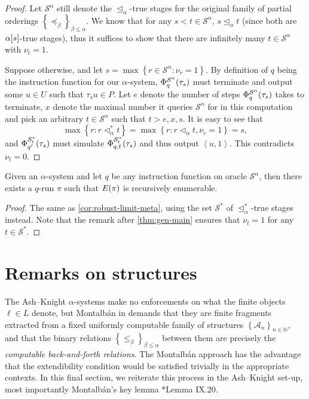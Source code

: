 \documentclass[11pt]{article}
\theoremstyle{plain}
\theoremstyle{definition}
\newcommand{\tuple}[1]{\left\langle #1 \right\rangle}
\begin{document}
\begin{proof}
  Let $\mathcal{S}^\alpha$ still denote the $\unlhd_\alpha$-true stages for the original family of partial orderings $\left\{\preceq_\beta\right\}_{\beta \leq \alpha}$. We know that for any $s < t \in \mathcal{S}^\alpha$, $s \unlhd_\alpha t$ (since both are $\alpha\mleft[s\mright]$-true stages), thus it suffices to show that there are infinitely many $t \in \mathcal{S}^\alpha$ with $\nu_t = 1$.

  Suppose otherwise, and let $s = \max \left\{r \in \mathcal{S}^\alpha : \nu_r = 1\right\}$. By definition of $q$ being the instruction function for our $\alpha$-system, $\Phi_q^{\mathcal{S}^\alpha}\mleft(\tau_s\mright)$ must terminate and output some $u \in U$ such that $\tau_s u \in P$. Let $e$ denote the number of steps $\Phi_q^{\mathcal{S}^\alpha}\mleft(\tau_s\mright)$ takes to terminate, $x$ denote the maximal number it queries $\mathcal{S}^\alpha$ for in this computation and pick an arbitrary $t \in \mathcal{S}^\alpha$ such that $t > e, x, s$. It is easy to see that
  \[\max \left\{r : r \lhd_\alpha^* t\right\} = \max \left\{r : r \lhd_\alpha t, \nu_r = 1\right\} = s,\]
  and $\Phi_{q'}^{\mathcal{S}^*_t}\mleft(\tau_s\mright)$ must simulate $\Phi_{q, t}^{\mathcal{S}^\alpha_t}\mleft(\tau_s\mright)$ and thus output $\tuple{u, 1}$. This contradicts $\nu_t = 0$.
\end{proof}

\begin{corollary}
  Given an $\alpha$-system and let $q$ be any instruction function on oracle $\mathcal{S}^\alpha$, then there exists a $q$-run $\pi$ such that $E\mleft(\pi\mright)$ is recursively enumerable.
\end{corollary}

\begin{proof}
  The same as \autoref{cor:robust-limit-meta}, using the set $\mathcal{S}^*$ of $\unlhd_\alpha^*$-true stages instead. Note that the remark after \autoref{thm:gen-main} ensures that $\nu_t = 1$ for any $t \in \mathcal{S}^*$.
\end{proof}

\section{Remarks on structures}

The Ash--Knight $\alpha$-systems make no enforcements on what the finite objects $\ell \in L$ denote, but Montalb\'an in \cite{montalban26-computable-structure} demands that they are finite fragments extracted from a fixed uniformly computable family of structures $\left\{\mathcal{A}_n\right\}_{n \in \mathbb{N}}$, and that the binary relations $\left\{\leq_\beta\right\}_{\beta \leq \alpha}$ between them are precisely the \emph{computable back-and-forth relations}. The Montalb\'an approach has the advantage that the extendibility condition would be satisfied trivially in the appropriate contexts. In this final section, we reiterate this process in the Ash--Knight set-up, most importantly Montalb\'an's key lemma \cite{montalban26-computable-structure}*{Lemma IX.20}.
\end{document}
